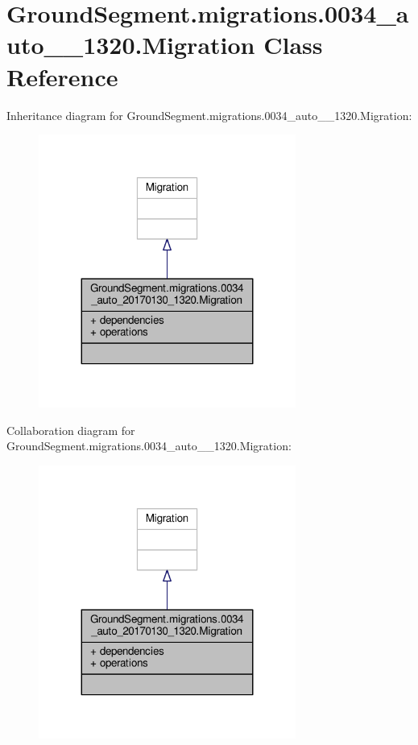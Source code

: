 \hypertarget{class_ground_segment_1_1migrations_1_10034__auto__20170130__1320_1_1_migration}{}\section{Ground\+Segment.\+migrations.0034\+\_\+auto\+\_\+\_\+1320.Migration Class Reference}
\label{class_ground_segment_1_1migrations_1_10034__auto__20170130__1320_1_1_migration}


Inheritance diagram for Ground\+Segment.\+migrations.0034\+\_\+auto\+\_\+\_\+1320.Migration\+:\nopagebreak
\begin{figure}[H]
\begin{center}
\leavevmode
\includegraphics[width=239pt]{class_ground_segment_1_1migrations_1_10034__auto__20170130__1320_1_1_migration__inherit__graph}
\end{center}
\end{figure}


Collaboration diagram for Ground\+Segment.\+migrations.0034\+\_\+auto\+\_\+\_\+1320.Migration\+:\nopagebreak
\begin{figure}[H]
\begin{center}
\leavevmode
\includegraphics[width=239pt]{class_ground_segment_1_1migrations_1_10034__auto__20170130__1320_1_1_migration__coll__graph}
\end{center}
\end{figure}
